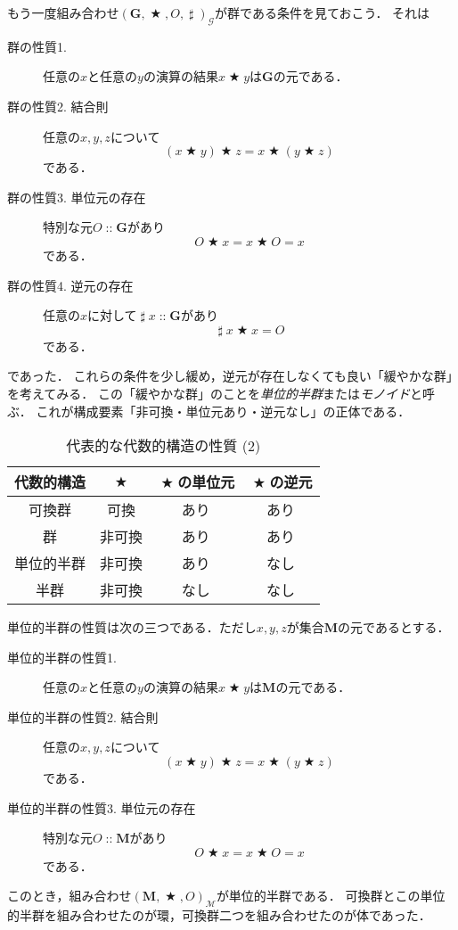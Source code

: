 \documentclass[twocolumn]{jsbook}
\DeclareMathOperator{\mathAnyBinaryOperator}{\bigstar}
\DeclareMathOperator{\mathInverse}{\sharp}
\DeclareMathOperator{\mathIn}{::}
\newcommand{\mathSet}[1]{\mathbf{#1}}
\newcommand{\mathMonoid}[3]{(#1,#2,#3)_\mathcal{M}}
\newcommand{\mathGroup}[4]{(#1,#2,#3,#4)_\mathcal{G}}
\newcommand{\keyword}[1]{\emph{#1}}
\begin{document}
もう一度組み合わせ$\mathGroup{\mathSet{G}}{\mathAnyBinaryOperator}{O}{\mathInverse}$が群である条件を見ておこう．
それは
\begin{description}
\item[群の性質1.] 任意の$x$と任意の$y$の演算の結果$x\mathAnyBinaryOperator y$は$\mathSet{G}$の元である．
\item[群の性質2. 結合則] 任意の$x,y,z$について$$(x\mathAnyBinaryOperator y)\mathAnyBinaryOperator z=x\mathAnyBinaryOperator(y\mathAnyBinaryOperator z)$$である．
\item[群の性質3. 単位元の存在] 特別な元$O\mathIn\mathSet{G}$があり$$O\mathAnyBinaryOperator x=x\mathAnyBinaryOperator O=x$$である．
\item[群の性質4. 逆元の存在] 任意の$x$に対して$\mathInverse x\mathIn\mathSet{G}$があり$$\mathInverse x\mathAnyBinaryOperator x=O$$である．
\end{description}
であった．
これらの条件を少し緩め，逆元が存在しなくても良い「緩やかな群」を考えてみる．
この「緩やかな群」のことを\keyword{単位的半群}または\keyword{モノイド}と呼ぶ．
これが構成要素「非可換・単位元あり・逆元なし」の正体である．

\begin{table}
\caption{代表的な代数的構造の性質 (2)}
\label{tab:group-and-monoid}
\begin{center}
\begin{tabular}{||c||c|c|c||}
\hline
代数的構造&$\mathAnyBinaryOperator$&$\mathAnyBinaryOperator$の単位元&$\mathAnyBinaryOperator$の逆元\\
\hline\hline
可換群&可換&あり&あり\\
群&非可換&あり&あり\\
単位的半群&非可換&あり&なし\\
半群&非可換&なし&なし\\
\hline
\end{tabular}
\end{center}
\end{table}

単位的半群の性質は次の三つである．ただし$x,y,z$が集合$\mathSet{M}$の元であるとする．
\begin{description}
\item[単位的半群の性質1.] 任意の$x$と任意の$y$の演算の結果$x\mathAnyBinaryOperator y$は$\mathSet{M}$の元である．
\item[単位的半群の性質2. 結合則] 任意の$x,y,z$について$$(x\mathAnyBinaryOperator y)\mathAnyBinaryOperator z=x\mathAnyBinaryOperator(y\mathAnyBinaryOperator z)$$である．
\item[単位的半群の性質3. 単位元の存在] 特別な元$O\mathIn\mathSet{M}$があり$$O\mathAnyBinaryOperator x=x\mathAnyBinaryOperator O=x$$である．
\end{description}
このとき，組み合わせ$\mathMonoid{\mathSet{M}}{\mathAnyBinaryOperator}{O}$が単位的半群である．
可換群とこの単位的半群を組み合わせたのが環，可換群二つを組み合わせたのが体であった．
\end{document}
